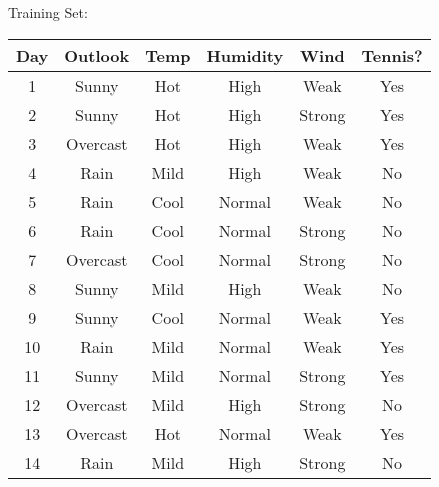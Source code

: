 \documentclass[12pt]{article}
\begin{document}
Training Set:
\begin{center}
\begin{tabular}{|c|c|c|c|c|c|} \hline
Day & Outlook & Temp & Humidity & Wind & Tennis? \\ \hline
1 & Sunny      & Hot     & High     & Weak   & Yes \\ \hline
2 & Sunny      & Hot     & High     & Strong & Yes \\ \hline
3 & Overcast & Hot     & High     & Weak   & Yes \\ \hline
4 & Rain         & Mild    & High     & Weak   & No \\ \hline
5 & Rain         & Cool    & Normal & Weak  & No \\ \hline
6 & Rain         & Cool    & Normal & Strong & No \\ \hline
7 & Overcast & Cool    & Normal & Strong & No \\ \hline
8 & Sunny      & Mild    & High     & Weak   & No \\ \hline
9 & Sunny       & Cool   & Normal & Weak   & Yes \\ \hline
10 & Rain        & Mild    & Normal & Weak  & Yes \\ \hline
11 & Sunny      & Mild   & Normal & Strong & Yes \\ \hline
12 & Overcast & Mild   & High     & Strong & No \\ \hline
13 & Overcast & Hot    & Normal & Weak  & Yes \\ \hline
14 & Rain         & Mild   & High     & Strong & No \\ \hline
\end{tabular} 
\end{center}
\end{document}
